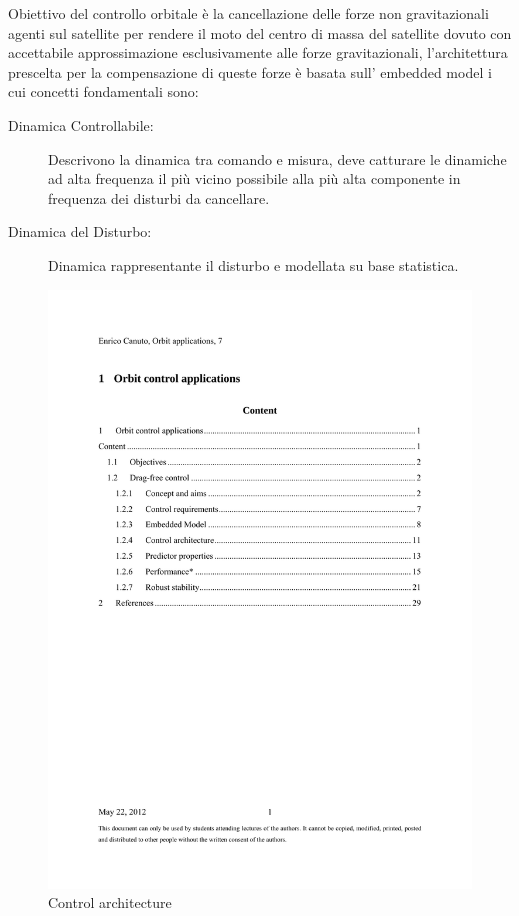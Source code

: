 Obiettivo del controllo orbitale è la cancellazione delle forze non
gravitazionali agenti sul satellite per rendere il moto del centro di massa del
satellite dovuto con accettabile approssimazione esclusivamente alle forze
gravitazionali, l'architettura prescelta per la compensazione di queste forze è
basata sull' embedded model i cui concetti fondamentali sono:
\begin{description}
\item[Dinamica Controllabile:] Descrivono la dinamica tra comando e misura, deve
catturare le dinamiche ad alta frequenza il più vicino possibile alla più alta
componente in frequenza dei disturbi da cancellare.
\item[Dinamica del Disturbo:] Dinamica rappresentante il disturbo e modellata su
base statistica.
\end{description} 

\begin{figure}
\includegraphics[page=13, trim=2.5cm 18.5cm 3cm 3cm,
clip=true,width=\textwidth]{control/orbit_control/images/cap7.pdf}
\caption{Control architecture}
\end{figure}